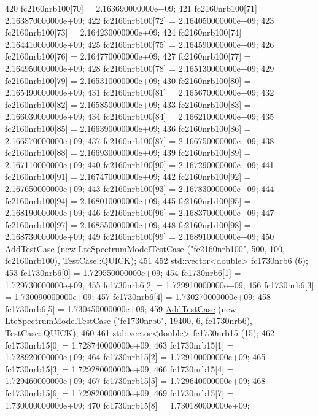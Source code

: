 \begin{DoxyCode}
420   fc2160nrb100[70] = 2.163690000000e+09;
421   fc2160nrb100[71] = 2.163870000000e+09;
422   fc2160nrb100[72] = 2.164050000000e+09;
423   fc2160nrb100[73] = 2.164230000000e+09;
424   fc2160nrb100[74] = 2.164410000000e+09;
425   fc2160nrb100[75] = 2.164590000000e+09;
426   fc2160nrb100[76] = 2.164770000000e+09;
427   fc2160nrb100[77] = 2.164950000000e+09;
428   fc2160nrb100[78] = 2.165130000000e+09;
429   fc2160nrb100[79] = 2.165310000000e+09;
430   fc2160nrb100[80] = 2.165490000000e+09;
431   fc2160nrb100[81] = 2.165670000000e+09;
432   fc2160nrb100[82] = 2.165850000000e+09;
433   fc2160nrb100[83] = 2.166030000000e+09;
434   fc2160nrb100[84] = 2.166210000000e+09;
435   fc2160nrb100[85] = 2.166390000000e+09;
436   fc2160nrb100[86] = 2.166570000000e+09;
437   fc2160nrb100[87] = 2.166750000000e+09;
438   fc2160nrb100[88] = 2.166930000000e+09;
439   fc2160nrb100[89] = 2.167110000000e+09;
440   fc2160nrb100[90] = 2.167290000000e+09;
441   fc2160nrb100[91] = 2.167470000000e+09;
442   fc2160nrb100[92] = 2.167650000000e+09;
443   fc2160nrb100[93] = 2.167830000000e+09;
444   fc2160nrb100[94] = 2.168010000000e+09;
445   fc2160nrb100[95] = 2.168190000000e+09;
446   fc2160nrb100[96] = 2.168370000000e+09;
447   fc2160nrb100[97] = 2.168550000000e+09;
448   fc2160nrb100[98] = 2.168730000000e+09;
449   fc2160nrb100[99] = 2.168910000000e+09;
450   \hyperlink{classns3_1_1TestCase_a3718088e3eefd5d6454569d2e0ddd835}{AddTestCase} (\textcolor{keyword}{new} \hyperlink{classLteSpectrumModelTestCase}{LteSpectrumModelTestCase} (\textcolor{stringliteral}{"fc2160nrb100"}, 500, 100, 
      fc2160nrb100), TestCase::QUICK);
451 
452   std::vector<double> fc1730nrb6 (6);
453   fc1730nrb6[0] = 1.729550000000e+09;
454   fc1730nrb6[1] = 1.729730000000e+09;
455   fc1730nrb6[2] = 1.729910000000e+09;
456   fc1730nrb6[3] = 1.730090000000e+09;
457   fc1730nrb6[4] = 1.730270000000e+09;
458   fc1730nrb6[5] = 1.730450000000e+09;
459   \hyperlink{classns3_1_1TestCase_a3718088e3eefd5d6454569d2e0ddd835}{AddTestCase} (\textcolor{keyword}{new} \hyperlink{classLteSpectrumModelTestCase}{LteSpectrumModelTestCase} (\textcolor{stringliteral}{"fc1730nrb6"}, 19400, 6, 
      fc1730nrb6), TestCase::QUICK);
460 
461   std::vector<double> fc1730nrb15 (15);
462   fc1730nrb15[0] = 1.728740000000e+09;
463   fc1730nrb15[1] = 1.728920000000e+09;
464   fc1730nrb15[2] = 1.729100000000e+09;
465   fc1730nrb15[3] = 1.729280000000e+09;
466   fc1730nrb15[4] = 1.729460000000e+09;
467   fc1730nrb15[5] = 1.729640000000e+09;
468   fc1730nrb15[6] = 1.729820000000e+09;
469   fc1730nrb15[7] = 1.730000000000e+09;
470   fc1730nrb15[8] = 1.730180000000e+09;

\end{DoxyCode}
